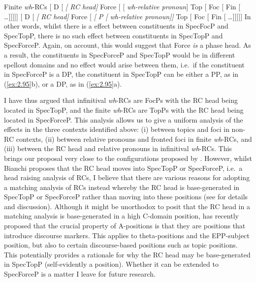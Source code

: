 \documentclass[output=paper]{langsci/langscibook}
\begin{document}
\ea\label{ex:2.95} Finite \emph{wh}-\glspl{RC}
    \ea {}[ D [ \textit{[ RC head]} Force [ [\textit{ \emph{wh}-relative pronoun}] Top [ Foc [ Fin [ \dots{}]]]]]
    \ex {}[ D [ \textit{[ RC head]} Force
    [ \textit{[ P [ \emph{wh}-relative pronoun]]} Top [ Foc [ Fin [  \dots{}]]]]]
    \z
\z
In other words, whilst there is a  effect between
constituents in SpecFocP and SpecTopP, there is no such effect between
constituents in SpecTopP and SpecForceP\@. Again, on 
account, this would suggest that Force \emph{is} a phase head. As a
result, the constituents in SpecForceP and SpecTopP would be in different
spellout domains and no  effect would arise
between them, i.e.\ if the constituent in SpecForceP is a DP, the constituent
in SpecTopP can be either a PP, as in (\ref{ex:2.95}b), or a DP, as in
(\ref{ex:2.95}a).

I have thus argued that infinitival \emph{wh}{-\glspl{RC} are FocPs with the \gls{RC} head
being located in SpecTopP, and the finite} \emph{wh}{-\glspl{RC} are TopPs with the RC
head being located in SpecForceP\@.} This analysis allows us to give a uniform
analysis of the  effects in the three contexts
identified above: (i) between topics and foci in non-RC contexts, (ii) between
relative pronouns and fronted foci in finite \emph{wh}-\glspl{RC}, and (iii)
between the \gls{RC} head and relative pronouns in
infinitival \emph{wh}{-RCs.} This brings our
proposal very close to the configurations proposed by
\textcite{Bianchi1999,Bianchi2000,Bianchi2004}. However, whilst Bianchi
proposes that the \gls{RC} head moves into SpecTopP or
SpecForceP, i.e.\ a head raising analysis
of RCs, I believe that there are various reasons for adopting a matching
analysis of \glspl{RC} instead whereby the RC head is
base-generated in SpecTopP or SpecForceP rather than moving into these
positions (see \citealt[Ch.\ 2]{Douglas2016} for details and discussion).
Although it might be unorthodox to posit that the \gls{RC}
head in a matching analysis is base-generated in a high C-domain position,
\textcite{Chierchia2016} has recently proposed that the crucial property of
A-positions is that they are positions that introduce discourse markers.  This
applies to theta-positions and the \gls{EPP}-subject
position, but also to certain discourse-based
positions such as topic positions. This potentially provides a rationale for
why the \gls{RC} head may be base-generated in SpecTopP (self-evidently a
 position).  Whether it can be extended to SpecForceP is a matter I
leave for future research.
\end{document}
